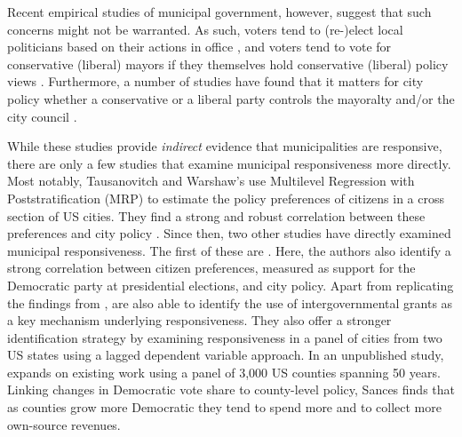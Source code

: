 \documentclass[a4paper,12pt]{article}
\begin{document}
Recent empirical studies of municipal government, however, suggest that such concerns might not be warranted. As such, voters tend to (re-)elect local politicians based on their actions in office \citep{arnold2012holding,burnett2017politics,boyne2009democracy}, and voters tend to vote for conservative (liberal)  mayors if they themselves hold conservative (liberal) policy views  \citep{sances2017ideology,boudreau2015lost,hopkins2017retrospective}. Furthermore, a number of studies have found that it matters for city policy whether a conservative or a liberal party controls the mayoralty and/or the city council \citep{fiva2016power,folke2014shades,blom2006parties,de2016mayoral}. 

While these studies provide \textit{indirect} evidence that municipalities are responsive, there are only a few studies that examine municipal responsiveness more directly. Most notably, Tausanovitch and Warshaw's use Multilevel Regression with Poststratification (MRP) to estimate the policy preferences of citizens in a cross section of US cities. They find a strong and robust correlation between these preferences and city policy \citep[for earlier efforts, see ][]{hajnal2010or,palus2010responsiveness}. Since then, two other studies have directly examined municipal responsiveness. The first of these are \cite{einstein2016pushing}. Here, the authors also identify a strong correlation between citizen preferences, measured as support for the Democratic party at presidential elections,  and city policy. Apart from replicating the findings from \citeauthor{tausanovitch2014representation}, \citeauthor{einstein2016pushing} are also able to identify the use of intergovernmental grants as a key mechanism underlying responsiveness. They also offer a stronger identification strategy by examining responsiveness in a panel of cities from two US states using a lagged dependent variable approach. In an unpublished study, \citet{sances2017voters} expands on existing work using a panel of 3,000 US counties spanning 50 years. Linking changes in Democratic vote share to county-level policy, Sances finds that as counties grow more Democratic they tend to spend more and to collect more own-source revenues.
\end{document}
